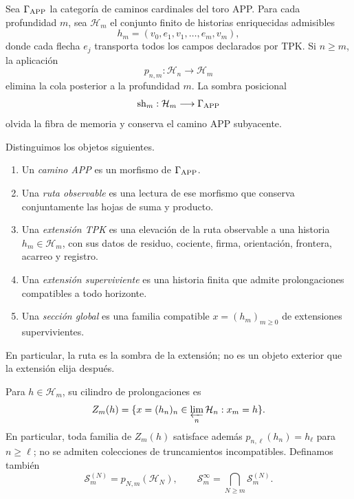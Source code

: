 Sea \(\Gamma_{\rm APP}\) la categoría de caminos cardinales del toro APP\@.
Para cada profundidad \(m\), sea \(\mathcal H_m\) el conjunto finito de
historias enriquecidas admisibles
\[
 h_m=(v_0,e_1,v_1,\ldots,e_m,v_m),
\]
donde cada flecha \(e_j\) transporta todos los campos declarados por TPK\@. Si
\(n\geq m\), la aplicación
\[
 p_{n,m}:\mathcal H_n\longrightarrow\mathcal H_m
\]
elimina la cola posterior a la profundidad \(m\). La sombra posicional
\[
 \operatorname{sh}_m:\mathcal H_m\longrightarrow\Gamma_{\rm APP}
\]
olvida la fibra de memoria y conserva el camino APP subyacente.

\begin{definition}
\label{def:jerarquia-extensiones}
Distinguimos los objetos siguientes.
\begin{enumerate}
  \item Un \emph{camino APP} es un morfismo de
  \(\Gamma_{\rm APP}\).
  \item Una \emph{ruta observable} es una lectura de ese morfismo que
  conserva conjuntamente las hojas de suma y producto.
  \item Una \emph{extensión TPK} es una elevación de la ruta observable a
  una historia \(h_m\in\mathcal H_m\), con sus datos de residuo, cociente,
  firma, orientación, frontera, acarreo y registro.
  \item Una \emph{extensión superviviente} es una historia finita que admite
  prolongaciones compatibles a todo horizonte.
  \item Una \emph{sección global} es una familia compatible
  \(x=(h_m)_{m\geq0}\) de extensiones supervivientes.
\end{enumerate}
En particular, la ruta es la sombra de la extensión; no es un objeto exterior
que la extensión elija después.
\end{definition}

Para \(h\in\mathcal H_m\), su cilindro de prolongaciones es
\[
 Z_m(h)=
 \{x=(h_n)_n\in\varprojlim_n\mathcal H_n:x_m=h\}.
\]
En particular, toda familia de \(Z_m(h)\) satisface además
\(p_{n,\ell}(h_n)=h_\ell\) para \(n\geq\ell\); no se admiten colecciones de
truncamientos incompatibles.
Definamos también
\[
 \mathcal S_m^{(N)}=p_{N,m}(\mathcal H_N),
 \qquad
 \mathcal S_m^\infty=\bigcap_{N\geq m}\mathcal S_m^{(N)}.
\]

